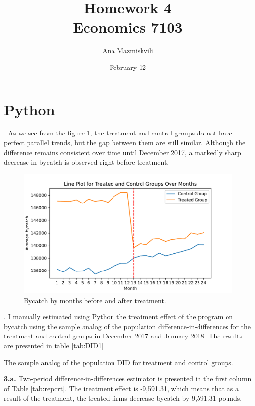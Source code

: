\documentclass{article}
\title{Homework 4 \\ Economics 7103}
\author{Ana Mazmishvili}
\date{February 12}
\begin{document}
  
\maketitle

\section{Python}

. As we see from the figure \ref{fig:trend}, the treatment and control groups do not have perfect parallel trends, but the gap between them are still similar. Although the difference remains consistent over time until December 2017, a markedly sharp decrease in bycatch is observed right before treatment.

\begin{figure}[h]
    \centering
    \includegraphics{homework 4/output/figure/trend1.pdf}
    \caption{ Bycatch by months before and after treatment. }
    \label{fig:trend}
\end{figure}

\FloatBarrier

. I manually estimated using Python the treatment effect of the program on bycatch using the sample analog of the population difference-in-differences for the treatment and control groups in December 2017 and January 2018. The results are presented in table \ref{tab:DID1}

\begin{table}[h]
    \centering
    
    \caption{The sample analog of the population DID for treatment and control groups.}
    \label{tab:DID1}
\end{table}

\FloatBarrier

\noindent \textbf{3.a. } Two-period difference-in-differences estimator is presented in the first column of Table \ref{tab:report}. The treatment effect is -9,591.31, which means that as a result of the treatment, the treated firms decrease bycatch by 9,591.31 pounds. 
\end{document}
